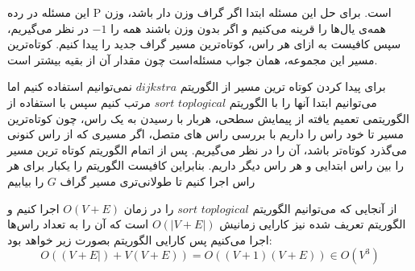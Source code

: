 \documentclass[]{article}
\begin{document}
این مسئله در رده P است.
برای حل این مسئله ابتدا اگر گراف وزن دار باشد، وزن همه‌ی یال‌ها را قرینه می‌کنیم
و اگر بدون وزن باشند همه را $-1$ در نظر می‌گیریم،
سپس کافیست به ازای هر راس، کوتاه‌ترین مسیر گراف جدید را پیدا کنیم. کوتاه‌ترین مسیر
این مجموعه، همان جواب مسئله‌است چون مقدار آن از بقیه بیشتر است.

برای پیدا کردن کوتاه ترین مسیر از الگوریتم $dijkstra$ نمی‌توانیم استفاده کنیم
اما می‌توانیم ابتدا آنها را با الگوریتم $toplogical$ $sort$ مرتب کنیم
سپس با استفاده از الگوریتمی تعمیم یافته از پیمایش سطحی، هربار با رسیدن به یک راس، چون کوتاه‌ترین
مسیر تا خود راس را داریم با بررسی راس های متصل، اگر مسیری که از راس کنونی می‌گذرد
کوتاه‌تر باشد، آن را در نظر می‌گیریم. پس از اتمام الگوریتم
کوتاه ترین مسیر را بین راس ابتدایی و هر راس دیگر داریم. بنابراین کافیست
الگوریتم را یکبار برای هر راس اجرا کنیم تا طولانی‌تری مسیر گراف $G$ را بیابیم

از آنجایی که می‌توانیم الگوریتم $toplogical$ $sort$
را در زمان $O(V + E)$ اجرا کنیم
و الگوریتم تعریف شده نیز کارایی زمانیش $O(|V + E|)$
است که آن را به تعداد راس‌ها اجرا می‌کنیم پس کارایی الگوریتم بصورت زیر خواهد بود:
$$O((V+E|) + V(V+E)) = O((V+1)(V+E)) \in O(V^3)$$
\end{document}
